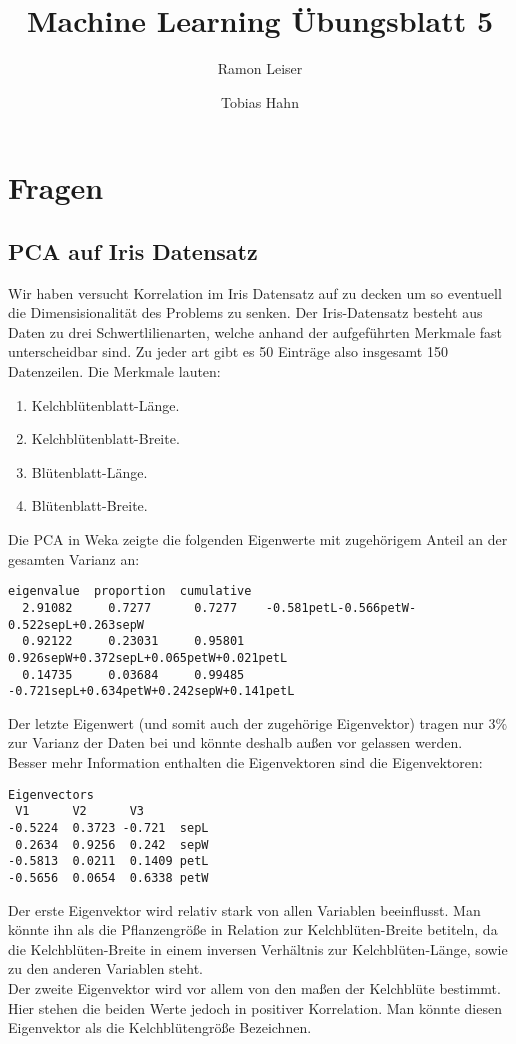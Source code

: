 \documentclass[a4paper]{article}
\title{Machine Learning Übungsblatt 5}
\author{Ramon Leiser\and Tobias Hahn}
\begin{document}
\maketitle
\newpage
\section*{Fragen}
\subsection{PCA auf Iris Datensatz}
Wir haben versucht Korrelation im Iris Datensatz auf zu decken um so eventuell die Dimensisionalität des Problems zu senken. Der Iris-Datensatz besteht aus Daten zu drei Schwertlilienarten, welche anhand der aufgeführten Merkmale fast unterscheidbar sind. Zu jeder art gibt es 50 Einträge also insgesamt 150 Datenzeilen. Die Merkmale lauten:
\begin{enumerate}
\item Kelchblütenblatt-Länge.
\item Kelchblütenblatt-Breite.
\item Blütenblatt-Länge.
\item Blütenblatt-Breite.
\end{enumerate}
Die PCA in Weka zeigte die folgenden Eigenwerte mit zugehörigem Anteil an der gesamten Varianz an:
\begin{lstlisting}
eigenvalue	proportion	cumulative
  2.91082	  0.7277 	  0.7277 	-0.581petL-0.566petW-0.522sepL+0.263sepW
  0.92122	  0.23031	  0.95801	0.926sepW+0.372sepL+0.065petW+0.021petL
  0.14735	  0.03684	  0.99485	-0.721sepL+0.634petW+0.242sepW+0.141petL
\end{lstlisting}
Der letzte Eigenwert (und somit auch der zugehörige Eigenvektor) tragen nur $ 3\% $ zur Varianz der Daten bei und könnte deshalb außen vor gelassen werden.  \\
Besser mehr Information enthalten die Eigenvektoren sind die Eigenvektoren:
\begin{lstlisting}
Eigenvectors
 V1	 	 V2	 	 V3	
-0.5224	 0.3723	-0.721 	sepL
 0.2634	 0.9256	 0.242 	sepW
-0.5813	 0.0211	 0.1409	petL
-0.5656	 0.0654	 0.6338	petW
\end{lstlisting}
Der erste Eigenvektor wird relativ stark von allen Variablen beeinflusst. Man könnte ihn als die Pflanzengröße in Relation zur Kelchblüten-Breite betiteln, da die Kelchblüten-Breite in einem inversen Verhältnis zur Kelchblüten-Länge, sowie zu den anderen Variablen steht. \\
Der zweite Eigenvektor wird vor allem von den maßen der Kelchblüte bestimmt. Hier stehen die beiden Werte jedoch in positiver Korrelation. Man könnte diesen Eigenvektor als die Kelchblütengröße Bezeichnen.\\
\end{document}
